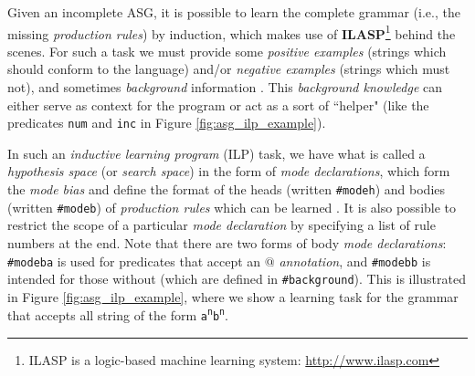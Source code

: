 Given an incomplete ASG, it is possible to learn the complete grammar (i.e., the missing \textit{production rules}) by induction, which makes use of \textbf{ILASP}\footnote{ILASP is a logic-based machine learning system: \url{http://www.ilasp.com}} behind the scenes. For such a task we must provide some \textit{positive examples} (strings which should conform to the language) and/or \textit{negative examples}  (strings which must not), and sometimes \textit{background} information \cite{law_representing_2019}. This \textit{background knowledge} can either serve as context for the program or act as a sort of ``helper" (like the predicates \texttt{num} and \texttt{inc} in Figure \ref{fig:asg_ilp_example}).

In such an \textit{inductive learning program} (ILP) task, we have what is called a \textit{hypothesis space} (or \textit{search space}) in the form of \textit{mode declarations}, which form the \textit{mode bias} and define the format of the heads (written \texttt{\#modeh}) and bodies (written \texttt{\#modeb}) of \textit{production rules} which can be learned \cite{law_inductive_nodate}. It is also possible to restrict the scope of a particular \textit{mode declaration} by specifying a list of rule numbers at the end. Note that there are two forms of body \textit{mode declarations}: \texttt{\#modeba} is used for predicates that accept an $@$ \textit{annotation}, and \texttt{\#modebb} is intended for those without (which are defined in \texttt{\#background}). This is illustrated in Figure \ref{fig:asg_ilp_example}, where we show a learning task for the grammar that accepts all string of the form \texttt{a\textsuperscript{n}b\textsuperscript{n}}.

